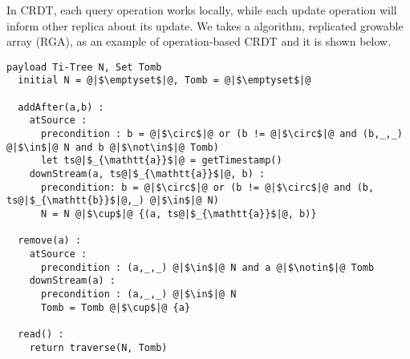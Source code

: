 In CRDT, each query operation works locally, while each update operation will inform other replica about its update. We takes a algorithm, replicated growable array (RGA), as an example of operation-based CRDT and it is shown below.


\begin{lstlisting}[caption={Pseudo-code of the Replicated Growable
    Array (RGA) CRDT (adapted from~\cite{ShapiroPBZ11})}, captionpos=b,label={lst:rga}]
  payload Ti-Tree N, Set Tomb
  initial N = @|$\emptyset$|@, Tomb = @|$\emptyset$|@

  addAfter(a,b) :
    atSource :
      precondition : b = @|$\circ$|@ or (b != @|$\circ$|@ and (b,_,_) @|$\in$|@ N and b @|$\not\in$|@ Tomb)
      let ts@|$_{\mathtt{a}}$|@ = getTimestamp()
    downStream(a, ts@|$_{\mathtt{a}}$|@, b) :
      precondition: b = @|$\circ$|@ or (b != @|$\circ$|@ and (b, ts@|$_{\mathtt{b}}$|@,_) @|$\in$|@ N)
      N = N @|$\cup$|@ {(a, ts@|$_{\mathtt{a}}$|@, b)}

  remove(a) :
    atSource :
      precondition : (a,_,_) @|$\in$|@ N and a @|$\notin$|@ Tomb
    downStream(a) :
      precondition : (a,_,_) @|$\in$|@ N
      Tomb = Tomb @|$\cup$|@ {a}

  read() :
    return traverse(N, Tomb)
\end{lstlisting}

\renewcommand{\algorithmcfname}{CRDT Implementation}
\noindent
\noindent%



